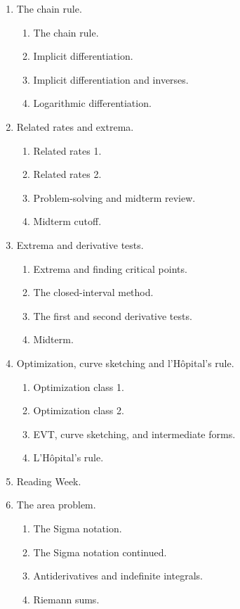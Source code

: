 \documentclass[../main.tex]{subfiles}
\begin{document}
\begin{multicols}{2}
\begin{enumerate}[wide, label={\textbf{Week \arabic*}.}]
    \item The chain rule.
      \begin{enumerate}[resume]
        \item The chain rule.
        \item Implicit differentiation.
        \item Implicit differentiation and inverses.
        \item Logarithmic differentiation.  
      \end{enumerate}

    \item Related rates and extrema.
      \begin{enumerate}[resume]
        \item Related rates 1.
        \item Related rates 2.
        \item Problem-solving and midterm review.
        \item[\faStar{}] Midterm cutoff.
      \end{enumerate}
      \columnbreak

    \item Extrema and derivative tests.
      \begin{enumerate}[resume]
        \item Extrema and finding critical points. 
        \item The closed-interval method.
        \item The first and second derivative tests.
        \item[\faStar{}] Midterm.
      \end{enumerate}

    \item Optimization, curve sketching and l'H\^opital's rule.
      \begin{enumerate}[resume]
        \item Optimization class 1.
        \item Optimization class 2.
        \item EVT, curve sketching, and intermediate forms.
        \item L'H\^opital's rule.
      \end{enumerate}

    \item Reading Week.

    \item The area problem.
      \begin{enumerate}[resume]
        \item The Sigma notation.
        \item The Sigma notation continued.
        \item Antiderivatives and indefinite integrals.
        \item Riemann sums.
      \end{enumerate}


\end{enumerate}
\end{multicols}
\end{document}
